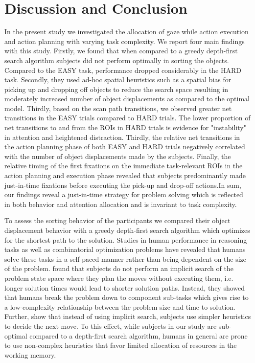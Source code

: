 \section{Discussion and Conclusion}

In the present study we investigated the allocation of gaze while action execution and action planning with varying task complexity. We report four main findings with this study. Firstly, we found that when compared to a greedy depth-first search algorithm subjects did not perform optimally in sorting the objects. Compared to the EASY task, performance dropped considerably in the HARD task. Secondly, they used ad-hoc spatial heuristics such as a spatial bias for picking up and dropping off objects to reduce the search space resulting in moderately increased number of object displacements as compared to the optimal model. Thirdly, based on the scan path transitions, we observed greater net transitions in the EASY trials compared to HARD trials. The lower proportion of net transitions to and from the ROIs in HARD trials is evidence for "instability" in attention and heightened distraction. Thirdly, the relative net transitions in the action planning phase of both EASY and HARD trials negatively correlated with the number of object displacements made by the subjects. Finally, the relative timing of the first fixations on the immediate task-relevant ROIs in the action planning and execution phase revealed that subjects predominantly made just-in-time fixations before executing the pick-up and drop-off actions.In sum, our findings reveal a just-in-time strategy for problem solving which is reflected in both behavior and attention allocation and is invariant to task complexity.

To assess the sorting behavior of the participants we compared their object displacement behavior with a greedy depth-first search algorithm which optimizes for the shortest path to the solution. Studies in human performance in reasoning tasks as well as combinatorial optimization problems \citep{MacGregor2011-yf} have revealed that humans solve these tasks in a self-paced manner rather than being dependent on the size of the problem. \citet{Pizlo2005-qi} found that subjects do not perform an implicit search of the problem state space where they plan the moves without executing them, i.e. longer solution times would lead to shorter solution paths. Instead, they showed that humans break the problem down to component sub-tasks which gives rise to a low-complexity relationship between the problem size and time to solution. Further, \citet{Pizlo2005-qi} show that instead of using implicit search, subjects use simpler heuristics to decide the next move. To this effect, while subjects in our study are sub-optimal compared to a depth-first search algorithm, humans in general are prone to use non-complex heuristics that favor limited allocation of resources in the working memory.


